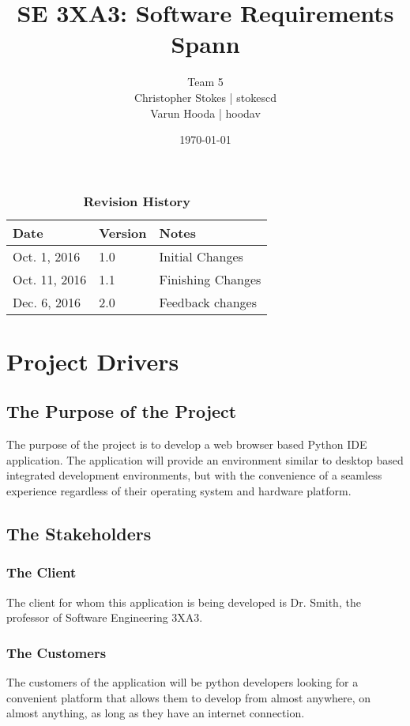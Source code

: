 \documentclass[12pt, titlepage]{article}
\title{SE 3XA3: Software Requirements\\Spann}
\author{Team 5
		\\ Christopher Stokes | stokescd
		\\ Varun Hooda | hoodav
}
\date{\today}
\begin{document}
\maketitle

\tableofcontents
\listoftables
\listoffigures

\begin{table}[bp]
\caption{\bf Revision History}
\begin{tabularx}{\textwidth}{p{3cm}p{2cm}X}
\toprule {\bf Date} & {\bf Version} & {\bf Notes}\\
\midrule
Oct. 1, 2016 & 1.0 & Initial Changes\\
Oct. 11, 2016 & 1.1 & Finishing Changes\\
Dec. 6, 2016 & 2.0 & Feedback changes\\
\bottomrule
\end{tabularx}
\end{table}

\newpage


\section{Project Drivers}

  \subsection{The Purpose of the Project}
  The purpose of the project is to develop a web browser based Python IDE
  application. The application will provide an environment similar to desktop
  based integrated development environments, but with the convenience of a
	seamless experience regardless of their operating system and hardware
	platform.

  \subsection{The Stakeholders}

    \subsubsection{The Client}
    The client for whom this application is being developed is Dr. Smith, the
    professor of Software Engineering 3XA3.

    \subsubsection{The Customers}
    The customers of the application will be python developers looking for a
    convenient platform that allows them to develop from almost anywhere, on
    almost anything, as long as they have an internet connection.
\end{document}
